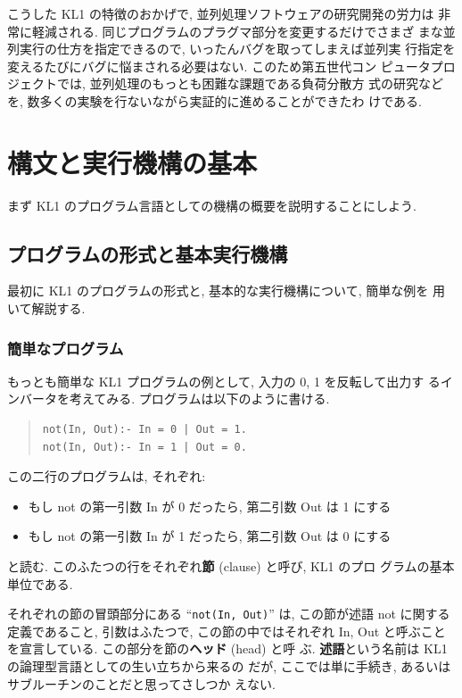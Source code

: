 \documentclass[a4,titlepage]{jsreport}
\def\em{\bf\dg}
\let\dg\bf
\newenvironment{program}{\begin{quote}}{\end{quote}}
\begin{document}
こうした KL1 の特徴のおかげで, 並列処理ソフトウェアの研究開発の労力は
非常に軽減される.  同じプログラムのプラグマ部分を変更するだけでさまざ
まな並列実行の仕方を指定できるので, いったんバグを取ってしまえば並列実
行指定を変えるたびにバグに悩まされる必要はない.  このため第五世代コン
ピュータプロジェクトでは, 並列処理のもっとも困難な課題である負荷分散方
式の研究などを, 数多くの実験を行ないながら実証的に進めることができたわ
けである.

\section{構文と実行機構の基本}\label{outline}
まず KL1 のプログラム言語としての機構の概要を説明することにしよう.

\subsection{プログラムの形式と基本実行機構}
最初に KL1 のプログラムの形式と, 基本的な実行機構について, 簡単な例を
用いて解説する.

\subsubsection{簡単なプログラム}
もっとも簡単な KL1 プログラムの例として, 入力の 0, 1 を反転して出力す
るインバータを考えてみる.  プログラムは以下のように書ける.
\begin{program}
\begin{Verbatim}[baselinestretch=0.8]
not(In, Out):- In = 0 | Out = 1.
not(In, Out):- In = 1 | Out = 0.
\end{Verbatim}
\end{program}

この二行のプログラムは, それぞれ:
\begin{itemize}
\item
もし not の第一引数 In が 0 だったら, 第二引数 Out は 1 にする
\item
もし not の第一引数 In が 1 だったら, 第二引数 Out は 0 にする
\end{itemize}
と読む.  このふたつの行をそれぞれ{\em 節} (clause) と呼び, KL1 のプロ
グラムの基本単位である.

それぞれの節の冒頭部分にある ``{\tt not(In, Out)}'' は, この節が述語 
not に関する定義であること, 引数はふたつで, この節の中ではそれぞれ In,
Out と呼ぶことを宣言している.  この部分を節の{\em ヘッド} (head) と呼
ぶ.  {\em 述語}という名前は KL1 の論理型言語としての生い立ちから来るの
だが, ここでは単に手続き, あるいはサブルーチンのことだと思ってさしつか
えない.
\end{document}
